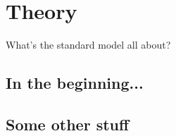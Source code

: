 \chapter{Theory} 
\label{ch:theory}

\minitoc

What's the standard model all about? 

\section{In the beginning...}
\section{Some other stuff}